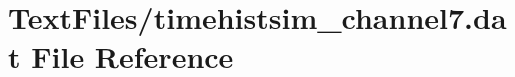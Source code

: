 \hypertarget{TextFiles_2timehistsim__channel7_8dat}{}\section{Text\+Files/timehistsim\+\_\+channel7.dat File Reference}
\label{TextFiles_2timehistsim__channel7_8dat}
